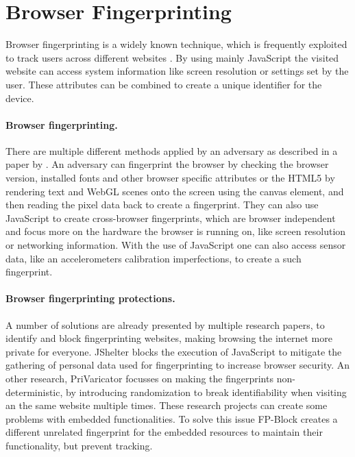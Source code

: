 \documentclass[11pt,
  oneside,openany,    %
]{scrreprt}
\begin{document}
\section{Browser Fingerprinting}
\label{sec:browser_fingerprint}
Browser fingerprinting is a widely known technique, which is frequently exploited to track users across different websites \cite{DBLP:conf/secrypt/PolcakSMHM23}.
By using mainly JavaScript the visited website can access system information like screen resolution or settings set by the user.
These attributes can be combined to create a unique identifier for the device.

\paragraph{Browser fingerprinting.}
\label{par:browser_fingerprint}
There are multiple different methods applied by an adversary as described in a paper by \citeauthor{DBLP:conf/ntms/UpathilakeLM15} \cite{DBLP:conf/ntms/UpathilakeLM15}.
An adversary can fingerprint the browser by checking the browser version, installed fonts and other browser specific attributes or the HTML5 by rendering text and WebGL scenes onto the screen using the canvas element, and then reading the pixel data back to create a fingerprint.
They can also use JavaScript to create cross-browser fingerprints, which are browser independent and focus more on the hardware the browser is running on, like screen resolution or networking information.
With the use of JavaScript one can also access sensor data, like an accelerometers calibration imperfections, to create a such fingerprint.

\paragraph{Browser fingerprinting protections.}
\label{par:browser_fingerprint_protect}
A number of solutions are already presented by multiple research papers, to identify and block fingerprinting websites, making browsing the internet more private for everyone. 
JShelter \cite{DBLP:conf/secrypt/PolcakSMHM23} blocks the execution of JavaScript to mitigate the gathering of personal data used for fingerprinting to increase browser security.
An other research, PriVaricator \cite{DBLP:conf/www/NikiforakisJL15} focusses on making the fingerprints non-deterministic, by introducing randomization to break identifiability when visiting an the same website multiple times.
These research projects can create some problems with embedded functionalities.
To solve this issue FP-Block \cite{DBLP:conf/esorics/TorresJM15} creates a different unrelated fingerprint for the embedded resources to maintain their functionality, but prevent tracking.
\end{document}
